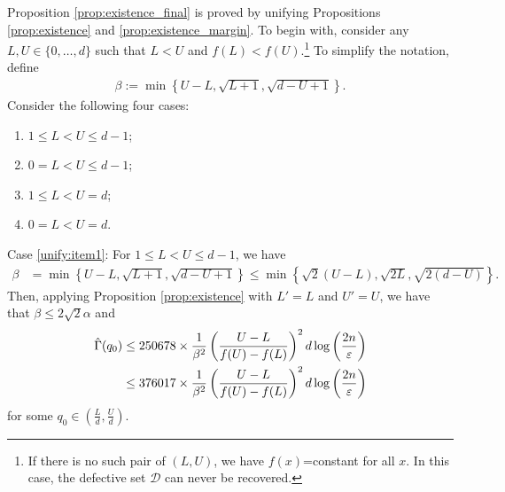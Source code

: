 \documentclass[onecolumn,letterpaper]{IEEEtran}
\newcommand{\cp}{{q}}
\newcommand{\up}{{U}}
\newcommand{\lw}{{L}}
\newcommand{\ap}{{\alpha}}
\newcommand{\bet}{{\beta}}
\newcommand{\exifinal}{{ 376017 \times \frac{1}{\bet^2} \left( \frac{\up-\lw}{f(\up)-f(\lw)} \right)^2  d\log \left( \frac{2n}{\varepsilon } \right)}}
\newcommand{\ftaup}{{\hat{\Gamma}}}
\newcommand{\cpns}{\cp_0}
\newcommand{\fTpns}{\ftaup (\cpns)}
\begin{document}
Proposition \ref{prop:existence_final} is proved by unifying Propositions \ref{prop:existence} and  \ref{prop:existence_margin}. To begin with, consider any  $\lw,\up \in \{0,\dots, d\}$ such that $\lw < \up$ and $f(\lw)<f(\up)$.\footnote{If there is no such pair of $(\lw,\up)$, we have $f(x)$=constant for all $x$. In this case, the defective set $\mathcal{D}$ can never be recovered.}  
To simplify the notation, define
\begin{align}
  \label{eq:def:beta}
    \bet := \min \left\{ \up-\lw , \sqrt{\lw+1} , \sqrt{d-\up+1} \right\}.
\end{align}
Consider the following four cases:
\begin{enumerate}[label=\roman*)]
\item $1 \le \lw < \up \le d-1$; \label{unify:item1}
\item $0 = \lw < \up \le d-1$; \label{unify:item2}
\item $1 \le \lw < \up = d$; \label{unify:item3}
\item $0 = \lw < \up = d$. \label{unify:item4}
\end{enumerate}


Case \ref{unify:item1}: For $1 \le \lw < \up \le d-1$, we have 
\begin{align}
\label{eq:alph:beta:case1}
    \bet &= \min\left\{ \up-\lw , \sqrt{\lw+1} , \sqrt{d-\up+1} \right\} \le \min\left\{ \sqrt{2}(\up-\lw) , \sqrt{2\lw} , \sqrt{2(d-\up)} \right\}.
\end{align}
Then, applying Proposition \ref{prop:existence} with $\lw'=\lw$ and $\up'=\up$, we have that $\bet\leq  2\sqrt{2}\ap$ and  
\begin{align}
    \fTpns %
    &\le 250678 \times \frac{1}{\bet^2} \left( \frac{\up-\lw}{f(\up)-f(\lw)} \right)^2  d\log \left( \frac{2n}{\varepsilon } \right) \notag\\ 
    &\le \exifinal
\end{align}
for some $\cpns \in \left(\frac \lw d, \frac \up d\right)$. 
\end{document}

